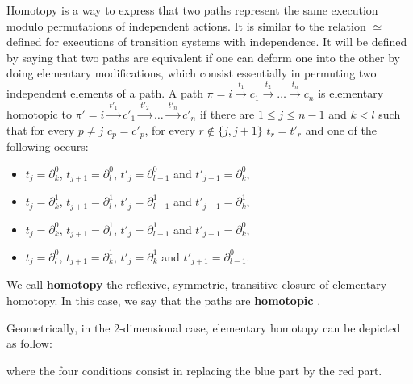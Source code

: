 				
	Homotopy is a way to express that two paths represent the same execution modulo permutations of independent actions. It is similar to the relation $\simeq$ defined for executions of transition systems with independence. It will be defined by saying that two paths are equivalent if one can deform one into the other by doing elementary modifications, which consist essentially in permuting two independent elements of a path. A path $\pi = i \xrightarrow{~t_1~} c_1 \xrightarrow{~t_2~} \ldots \xrightarrow{~t_n~} c_n$ is elementary homotopic to $\pi' = i \xrightarrow{~t'_1~} c'_1 \xrightarrow{~t'_2~} \ldots \xrightarrow{~t'_n~} c'_n$ if there are $1 \leq j \leq n-1$ and $k < l$ such that for every $p \neq j$ $c_p = c'_p$, for every $r \notin \{j, j+1\}$ $t_r = t'_r$ and one of the following occurs:
		\begin{itemize}
			\item $t_j = \partial_k^0$, $t_{j+1} = \partial_l^0$, $t'_j = \partial_{l-1}^0$ and $t'_{j+1} = \partial_k^0$,
			\item $t_j = \partial_k^1$, $t_{j+1} = \partial_l^1$, $t'_j = \partial_{l-1}^1$ and $t'_{j+1} = \partial_k^1$,
			\item $t_j = \partial_k^0$, $t_{j+1} = \partial_l^1$, $t'_j = \partial_{l-1}^1$ and $t'_{j+1} = \partial_k^0$,
			\item $t_j = \partial_l^0$, $t_{j+1} = \partial_k^1$, $t'_j = \partial_{k}^1$ and $t'_{j+1} = \partial_{l-1}^0$.
		\end{itemize}
	We call \textbf{homotopy} the reflexive, symmetric, transitive closure of elementary homotopy. In this case, we say that the paths are \textbf{homotopic} \cite{vanglabbeek05}.

	
	Geometrically, in the 2-dimensional case, elementary homotopy can be depicted as follow:
	
				\begin{figure}[H]
					\begin{center}
    						
  					\end{center}
				\end{figure}
	
\noindent where the four conditions consist in replacing the blue part by the red part.
	
